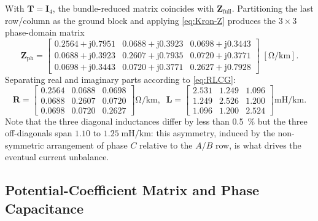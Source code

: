 \documentclass[11pt,a4paper]{article}
\newcommand{\jj}{\mathrm{j}}
\newcommand{\matZ}{\bm{Z}}
\newcommand{\matR}{\bm{R}}
\newcommand{\matL}{\bm{L}}
\newcommand{\matT}{\bm{T}}
\newcommand{\matI}{\bm{I}}
\begin{document}
With \(\matT=\matI_{4}\), the bundle-reduced matrix coincides with
\(\matZ_{\mathrm{full}}\). Partitioning the last row/column as the ground
block and applying \eqref{eq:Kron-Z} produces the \(3\times 3\) phase-domain
matrix
\begin{equation*}
\matZ_{\mathrm{ph}}=
\begin{bmatrix}
0.2564{+}\jj 0.7951 & 0.0688{+}\jj 0.3923 & 0.0698{+}\jj 0.3443\\
0.0688{+}\jj 0.3923 & 0.2607{+}\jj 0.7935 & 0.0720{+}\jj 0.3771\\
0.0698{+}\jj 0.3443 & 0.0720{+}\jj 0.3771 & 0.2627{+}\jj 0.7928
\end{bmatrix}\;[\si{\ohm/\kilo\metre}].
\end{equation*}
Separating real and imaginary parts according to \eqref{eq:RLCG}:
\begin{equation*}
\matR=
\begin{bmatrix}
0.2564 & 0.0688 & 0.0698\\
0.0688 & 0.2607 & 0.0720\\
0.0698 & 0.0720 & 0.2627
\end{bmatrix}\!\si{\ohm/\kilo\metre},\;\;
\matL=
\begin{bmatrix}
2.531 & 1.249 & 1.096\\
1.249 & 2.526 & 1.200\\
1.096 & 1.200 & 2.524
\end{bmatrix}\!\si{\milli\henry/\kilo\metre}.
\end{equation*}
Note that the three diagonal inductances differ by less than \SI{0.5}{\percent}
but the three off-diagonals span \(1.10\) to \(1.25\;\si{\milli\henry/\kilo\metre}\):
this asymmetry, induced by the non-symmetric arrangement of phase \(C\)
relative to the \(A\)/\(B\) row, is what drives the eventual current
unbalance.

\subsection{Potential-Coefficient Matrix and Phase Capacitance}
\end{document}
